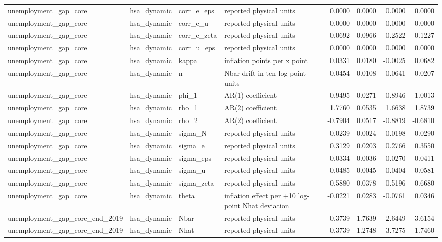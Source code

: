 \begin{tabular}{llllrrrr}
unemployment\_gap\_core & hsa\_dynamic & corr\_e\_eps & reported physical units & 0.0000 & 0.0000 & 0.0000 & 0.0000 \\
unemployment\_gap\_core & hsa\_dynamic & corr\_e\_u & reported physical units & 0.0000 & 0.0000 & 0.0000 & 0.0000 \\
unemployment\_gap\_core & hsa\_dynamic & corr\_e\_zeta & reported physical units & -0.0692 & 0.0966 & -0.2522 & 0.1227 \\
unemployment\_gap\_core & hsa\_dynamic & corr\_u\_eps & reported physical units & 0.0000 & 0.0000 & 0.0000 & 0.0000 \\
unemployment\_gap\_core & hsa\_dynamic & kappa & inflation points per x point & 0.0331 & 0.0180 & -0.0025 & 0.0682 \\
unemployment\_gap\_core & hsa\_dynamic & n & Nbar drift in ten-log-point units & -0.0454 & 0.0108 & -0.0641 & -0.0207 \\
unemployment\_gap\_core & hsa\_dynamic & phi\_1 & AR(1) coefficient & 0.9495 & 0.0271 & 0.8946 & 1.0013 \\
unemployment\_gap\_core & hsa\_dynamic & rho\_1 & AR(2) coefficient & 1.7760 & 0.0535 & 1.6638 & 1.8739 \\
unemployment\_gap\_core & hsa\_dynamic & rho\_2 & AR(2) coefficient & -0.7904 & 0.0517 & -0.8819 & -0.6810 \\
unemployment\_gap\_core & hsa\_dynamic & sigma\_N & reported physical units & 0.0239 & 0.0024 & 0.0198 & 0.0290 \\
unemployment\_gap\_core & hsa\_dynamic & sigma\_e & reported physical units & 0.3129 & 0.0203 & 0.2766 & 0.3550 \\
unemployment\_gap\_core & hsa\_dynamic & sigma\_eps & reported physical units & 0.0334 & 0.0036 & 0.0270 & 0.0411 \\
unemployment\_gap\_core & hsa\_dynamic & sigma\_u & reported physical units & 0.0485 & 0.0045 & 0.0404 & 0.0581 \\
unemployment\_gap\_core & hsa\_dynamic & sigma\_zeta & reported physical units & 0.5880 & 0.0378 & 0.5196 & 0.6680 \\
unemployment\_gap\_core & hsa\_dynamic & theta & inflation effect per +10 log-point Nhat deviation & -0.0221 & 0.0283 & -0.0761 & 0.0346 \\
unemployment\_gap\_core\_end\_2019 & hsa\_dynamic & Nbar & reported physical units & 0.3739 & 1.7639 & -2.6449 & 3.6154 \\
unemployment\_gap\_core\_end\_2019 & hsa\_dynamic & Nhat & reported physical units & -0.3739 & 1.2748 & -3.7275 & 1.7460 \\

\end{tabular}
